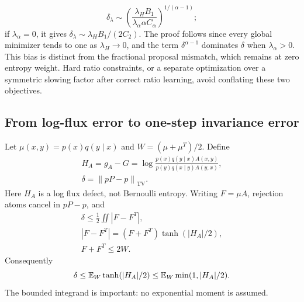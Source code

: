 \documentclass[pdflatex,iicol,sn-mathphys-ay]{sn-jnl}
\theoremstyle{definition}\newtheorem{definition}[theorem]{Definition}
\theoremstyle{remark}\newtheorem{remark}[theorem]{Remark}
\numberwithin{equation}{section}
\newcommand{\norm}[1]{\left\lVert#1\right\rVert}\newcommand{\TV}{\mathrm{TV}}
\newcommand{\1}{\mathbf 1}
\begin{document}
\begin{equation}
\delta_\lambda\sim
\left(\frac{\lambda_HB_1}{\lambda_\alpha\alpha C_\alpha}\right)^{1/(\alpha-1)};\label{eq:entropyasymptotic}
\end{equation}
if $\lambda_\alpha=0$, it gives $\delta_\lambda\sim\lambda_HB_1/(2C_2)$. The proof follows since every global minimizer tends to one as $\lambda_H\to0$, and the term $\delta^{\alpha-1}$ dominates $\delta$ when $\lambda_\alpha>0$. This bias is distinct from the fractional proposal mismatch, which remains at zero entropy weight. Hard ratio constraints, or a separate optimization over a symmetric slowing factor after correct ratio learning, avoid conflating these two objectives.

\subsection{From log-flux error to one-step invariance error}
Let $\mu(x,y)=p(x)q(y\mid x)$ and $W=(\mu+\mu^T)/2$. Define
\[
\begin{gathered}
H_A=g_A-G=\log\frac{p(x)q(y\mid x)A(x,y)}{p(y)q(x\mid y)A(y,x)},\\
\delta=\norm{pP-p}_{\TV}.
\end{gathered}
\]
Here $H_A$ is a log flux defect, not Bernoulli entropy. Writing $F=\mu A$, rejection atoms cancel in $pP-p$, and
\[
\begin{gathered}
\delta\le\tfrac12\iint|F-F^T|,\\
 |F-F^T|=(F+F^T)\tanh(|H_A|/2),\\
 F+F^T\le2W.
\end{gathered}
\]
Consequently
\begin{equation}
\delta\le\mathbb E_W\tanh(|H_A|/2)
\le\mathbb E_W\min(1,|H_A|/2).\label{eq:fluxbound}
\end{equation}
The bounded integrand is important: no exponential moment is assumed.
\end{document}
